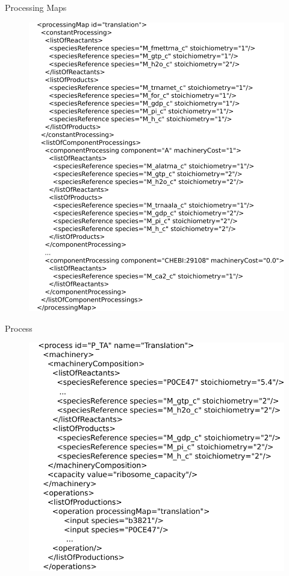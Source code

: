 \documentclass{beamer}
\begin{document}
\begin{frame}{Processing Maps}
  \begin{figure}
    \centering
    \includegraphics[width=\linewidth]{processing_map}
  \end{figure}
\end{frame}

\begin{frame}{Process}
  \begin{figure}
    \centering
    \includegraphics[width=\linewidth]{process}
  \end{figure}
\end{frame}
\end{document}
